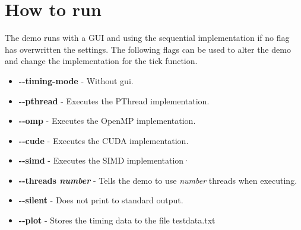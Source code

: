 \documentclass[a4paper,11pt]{article}
\begin{document}
\section{How to run}
The demo runs with a GUI and using the sequential implementation
if no flag has overwritten the settings. The following flags can be
used to alter the demo and change the implementation for the tick
function.
\begin{itemize}[label=,leftmargin=0pt]
\item \textbf{-\--timing-mode} - Without gui.
\item \textbf{-\--pthread} - Executes the PThread implementation.
\item \textbf{-\--omp} - Executes the OpenMP implementation.
\item \textbf{-\--cude} - Executes the CUDA implementation.
\item \textbf{-\--simd} - Executes the SIMD implementation·
\item \textbf{-\--threads \textit{number}} - Tells the demo to use
  \textit{number} threads when executing.

\item \textbf{-\--silent} - Does not print to standard output.
\item \textbf{-\--plot} - Stores the timing data to the file testdata.txt
\end{itemize}
\end{document}
